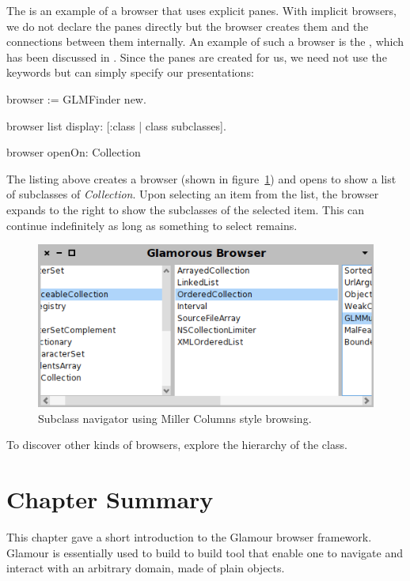 \documentclass[a4paper,10pt,twoside]{book}
\begin{document}
The  is an example of a browser that uses explicit
panes. With implicit browsers, we do not declare the panes directly
but the browser creates them and the connections between them
internally. An example of such a browser is the , which has
been discussed in . Since the panes are
created for us, we need not use the  keywords but can
simply specify our presentations:

\begin{code}{}
browser := GLMFinder new.

browser list
  display: [:class | class subclasses].

browser openOn: Collection
\end{code}

The listing above creates a browser (shown in figure~\ref{fig:finder})
and opens to show a list of subclasses of \emph{Collection}. Upon
selecting an item from the list, the browser expands to the right to
show the subclasses of the selected item. This can continue
indefinitely as long as something to select remains.

\begin{figure}[htbp]
\centerline{\includegraphics[width=\linewidth]{finder.png}}
\caption{Subclass navigator using Miller Columns style browsing.}
\label{fig:finder}
\end{figure}

To discover other kinds of browsers, explore the hierarchy of the
 class.

\section{Chapter Summary}

This chapter gave a short introduction to the Glamour browser framework. Glamour is essentially used to build to build tool that enable one to navigate and interact with an arbitrary domain, made of plain objects.
\end{document}
